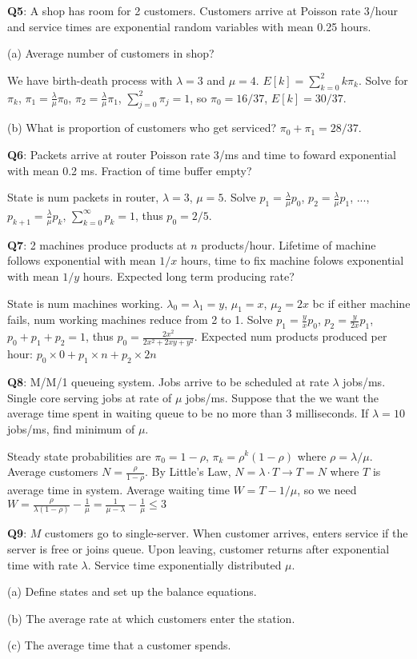 \documentclass{scrartcl}
\begin{document}
\begin{multicols*}{3}
{\bf Q5}: A shop has room for 2 customers. Customers arrive at Poisson rate 3/hour and service times are exponential random variables with mean 0.25 hours.

(a) Average number of customers in shop?

We have birth-death process with $\lambda=3$ and $\mu=4$. $E[k] = \sum_{k=0}^2k\pi_k$. Solve for $\pi_k$, $\pi_1=\frac{\lambda}{\mu}\pi_0$, $\pi_2=\frac{\lambda}{\mu}\pi_1$, $\sum_{j=0}^2\pi_j=1$, so $\pi_0=16/37$, $E[k]=30/37$.

(b) What is proportion of customers who get serviced? $\pi_0+\pi_1=28/37$.



{\bf Q6}: Packets arrive at router Poisson rate 3/ms and time to foward exponential with mean 0.2 ms. Fraction of time buffer empty?

State is num packets in router, $\lambda=3$, $\mu=5$. Solve $p_1=\frac{\lambda}{\mu}p_0$, $p_2=\frac{\lambda}{\mu}p_1$, ..., $p_{k+1}=\frac{\lambda}{\mu}p_k$, $\sum_{k=0}^\infty p_k=1$, thus $p_0=2/5$.



{\bf Q7}: 2 machines produce products at $n$ products/hour. Lifetime of machine follows exponential with mean $1/x$ hours, time to fix machine folows exponential with mean $1/y$ hours. Expected long term producing rate?

State is num machines working. $\lambda_0=\lambda_1=y$, $\mu_1=x$, $\mu_2=2x$ bc if either machine fails, num working machines reduce from 2 to 1. Solve $p_1=\frac{y}{x}p_0$, $p_2=\frac{y}{2x}p_1$, $p_0+p_1+p_2=1$, thus $p_0=\frac{2x^2}{2x^2+2xy+y^2}$. Expected num products produced per hour: $p_0\times 0+p_1\times n+p_2\times 2n$



{\bf Q8}: M/M/1 queueing system. Jobs arrive to be scheduled at rate $\lambda$ jobs/ms. Single core serving jobs at rate of $\mu$ jobs/ms. Suppose that the we want the average time spent in waiting queue to be no more than 3 milliseconds. If $\lambda = 10$ jobs/ms, find minimum of $\mu$.

Steady state probabilities are $\pi_0 = 1 − \rho$, $\pi_k =\rho^k(1−\rho)$ where $\rho=\lambda/\mu$. Average customers $N=\frac{\rho}{1-\rho}$. By Little's Law, $N = \lambda\cdot T\to T=N$ where $T$ is average time in system. Average waiting time $W=T-1/\mu$, so we need $W=\frac{\rho}{\lambda(1-\rho)}-\frac{1}{\mu}=\frac{1}{\mu-\lambda}-\frac{1}{\mu}\leq 3$



{\bf Q9}: $M$ customers go to single-server. When customer arrives, enters service if the server is free or joins queue. Upon leaving, customer returns after exponential time with rate $\lambda$. Service time exponentially distributed $\mu$.

(a) Define states and set up the balance equations.

(b) The average rate at which customers enter the station.

(c) The average time that a customer spends.



\end{multicols*}
\end{document}
